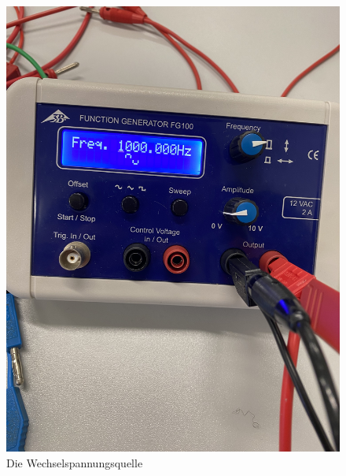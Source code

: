   \begin{figure}
    \centering
    \includegraphics{Bilder/spannungsquelle.jpg}
    \caption{Die Wechselspannungsquelle}
    \label{fig:spann}
  \end{figure}
